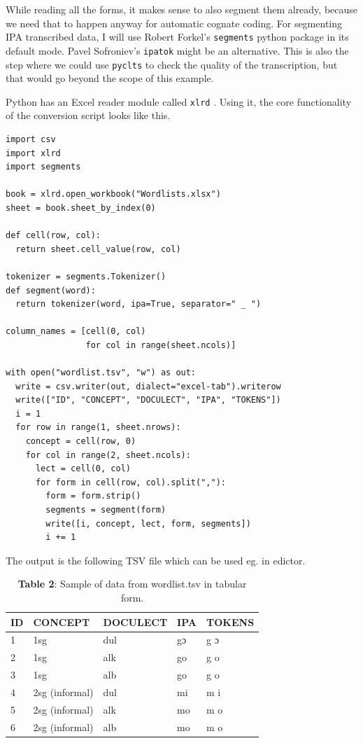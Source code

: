 \documentclass[
  a4paper,
  14pt,
  oneside,
  tablecaptionabove
]{scrbook}
\begin{document}
While reading all the forms, it makes sense to also segment them
already, because we need that to happen anyway for automatic cognate
coding. For segmenting IPA transcribed data, I will use Robert Forkel's
\lstinline!segments! python package in its default mode. Pavel
Sofroniev's \lstinline!ipatok! might be an alternative. This is also the
step where we could use \lstinline!pyclts! to check the quality of the
transcription, but that would go beyond the scope of this example.

Python has an Excel reader module called \lstinline!xlrd! . Using it,
the core functionality of the conversion script looks like this.

\begin{lstlisting}
import csv
import xlrd
import segments

book = xlrd.open_workbook("Wordlists.xlsx")
sheet = book.sheet_by_index(0)

def cell(row, col):
  return sheet.cell_value(row, col)

tokenizer = segments.Tokenizer()
def segment(word):
  return tokenizer(word, ipa=True, separator=" _ ")

column_names = [cell(0, col)
                for col in range(sheet.ncols)]

with open("wordlist.tsv", "w") as out:
  write = csv.writer(out, dialect="excel-tab").writerow
  write(["ID", "CONCEPT", "DOCULECT", "IPA", "TOKENS"])
  i = 1
  for row in range(1, sheet.nrows):
    concept = cell(row, 0)
    for col in range(2, sheet.ncols):
      lect = cell(0, col)
      for form in cell(row, col).split(","):
        form = form.strip()
        segments = segment(form)
        write([i, concept, lect, form, segments])
        i += 1
\end{lstlisting}

The output is the following TSV file which can be used eg. in edictor.

\begin{table}[h]
\centering
\begin{tabular}{@{}lllll@{}}
\toprule
ID & CONCEPT        & DOCULECT & IPA & TOKENS \\ \midrule
1  & 1sg            & dul      & gɔ  & g ɔ    \\
2  & 1sg            & alk      & go  & g o    \\
3  & 1sg            & alb      & go  & g o    \\
4  & 2sg (informal) & dul      & mi  & m i    \\
5  & 2sg (informal) & alk      & mo  & m o    \\
6  & 2sg (informal) & alb      & mo  & m o    \\ \bottomrule
\end{tabular}
\captionsetup{justification=centering}
\caption*{\small \textbf{Table 2}: Sample of data from wordlist.tsv in tabular form.}
\end{table}
\end{document}
